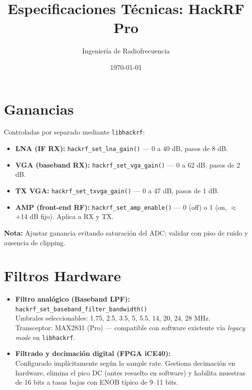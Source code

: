 \documentclass[11pt]{article}
\title{Especificaciones Técnicas: HackRF Pro}
\author{Ingeniería de Radiofrecuencia}
\date{\today}
\begin{document}
\maketitle
\tableofcontents
\newpage

\section{Ganancias}

Controladas por separado mediante \texttt{libhackrf}:

\begin{itemize}
    \item \textbf{LNA (IF RX):} \texttt{hackrf\_set\_lna\_gain()} — 0 a 40 dB, pasos de 8 dB.
    \item \textbf{VGA (baseband RX):} \texttt{hackrf\_set\_vga\_gain()} — 0 a 62 dB, pasos de 2 dB.
    \item \textbf{TX VGA:} \texttt{hackrf\_set\_txvga\_gain()} — 0 a 47 dB, pasos de 1 dB.
    \item \textbf{AMP (front-end RF):} \texttt{hackrf\_set\_amp\_enable()} — 0 (off) o 1 (on, $\approx$+14 dB fijo). Aplica a RX y TX.
\end{itemize}

\textbf{Nota:} Ajustar ganancia evitando saturación del ADC; validar con piso de ruido y ausencia de clipping.

\section{Filtros Hardware}

\begin{itemize}
    \item \textbf{Filtro analógico (Baseband LPF):} \texttt{hackrf\_set\_baseband\_filter\_bandwidth()}\\
    Umbrales seleccionables: 1.75, 2.5, 3.5, 5, 5.5, 14, 20, 24, 28 MHz.\\
    Transceptor: MAX2831 (Pro) — compatible con software existente vía \textit{legacy mode} en \texttt{libhackrf}.

    \item \textbf{Filtrado y decimación digital (FPGA iCE40):}\\
    Configurado implícitamente según la sample rate. Gestiona decimación en hardware, elimina el pico DC (antes resuelto en software) y habilita muestras de 16 bits a tasas bajas con ENOB típico de 9--11 bits.
\end{itemize}
\end{document}
